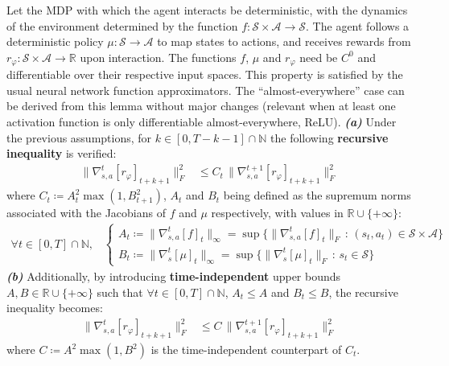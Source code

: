 \begin{lemma}
\label{lemma}
Let the MDP with which the agent interacts be deterministic,
with the dynamics of the environment determined
by the function $f: \mathcal{S} \times \mathcal{A} \rightarrow \mathcal{S}$.
The agent follows a deterministic policy $\mu: \mathcal{S} \rightarrow \mathcal{A}$
to map states to actions,
and receives rewards from
$r_\varphi: \mathcal{S} \times \mathcal{A} \rightarrow \mathbb{R}$
upon interaction.
The functions $f$, $\mu$ and $r_\varphi$ need be $C^0$ and differentiable
over their respective input spaces.
This property is satisfied by the usual neural network function approximators.
The ``almost-everywhere'' case can be derived from this lemma without major changes
(relevant when at least one activation function is only differentiable almost-everywhere, ReLU).
\textbf{\emph{(a)}} Under the previous assumptions,
for $k \in [0, T-k-1] \cap \mathbb{N}$ the following \textbf{recursive inequality} is verified:
\begin{align}
\lVert \nabla_{s,a}^t[r_\varphi]_{t+k+1} \rVert ^2_F
&\leq
C_t
\, \lVert \nabla_{s,a}^{t+1}[r_\varphi]_{t+k+1} \rVert ^2_F
\end{align}
where $C_t \coloneqq A_t^2 \max(1, B_{t+1}^2)$,
$A_t$ and $B_t$ being defined as the supremum norms associated with the Jacobians of $f$
and $\mu$ respectively, with values in $\mathbb{R} \cup \{+\infty\}$:
\begin{align}
\forall t \in [0, T] \cap \mathbb{N} \text{,} \quad
\begin{cases}
A_t \coloneqq \lVert\nabla_{s,a}^t[f]_t\rVert _\infty
= \sup \big\{\lVert\nabla_{s,a}^t[f]_t\rVert _F \, : \, (s_t, a_t) \in
\mathcal{S} \times \mathcal{A} \big\} \\
B_t \coloneqq \lVert\nabla_s^t[\mu]_t\rVert _\infty
= \sup \big\{\lVert\nabla_s^t[\mu]_t\rVert _F \, : \, s_t \in
\mathcal{S} \big\}
\end{cases}
\end{align}
\textbf{\emph{(b)}} Additionally, by introducing \textbf{time-independent} upper bounds
$A, B \in \mathbb{R} \cup \{+\infty\}$
such that $\forall t \in [0, T] \cap \mathbb{N}$,
$A_t \leq A$ and $B_t \leq B$, the recursive inequality becomes:
\begin{align}
\lVert \nabla_{s,a}^t[r_\varphi]_{t+k+1} \rVert ^2_F
&\leq
C
\, \lVert \nabla_{s,a}^{t+1}[r_\varphi]_{t+k+1} \rVert ^2_F
\end{align}
where $C \coloneqq A^2 \max(1, B^2)$ is the time-independent counterpart of $C_t$.
\end{lemma}

